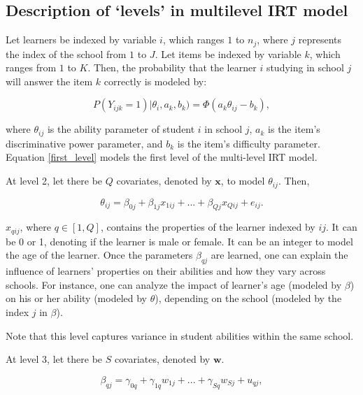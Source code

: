\documentclass[12pt]{article}
\begin{document}
\subsection{Description of `levels' in multilevel IRT model}

Let learners be indexed by variable $i$, which ranges $1$ to $n_j$, where $j$ represents the index of the school from $1$ to $J$. Let items be indexed by variable $k$, which ranges from $1$ to $K$. Then, the probability that the learner $i$ studying in school $j$ will answer the item $k$ correctly is modeled by:

\begin{equation}\label{first_level}
    P(Y_{ijk}=1) | \theta_i, a_k, b_k) = \Phi(a_k \theta_{ij} - b_k),
\end{equation}

where $\theta_{ij}$ is the ability parameter of student $i$ in school $j$, $a_k$ is the item's discriminative power parameter, and $b_k$ is the item's difficulty parameter. Equation \eqref{first_level} models the first level of the multi-level IRT model.

At level 2, let there be $Q$ covariates, denoted by $\boldsymbol{x}$, to model $\theta_{ij}$. Then,

\begin{equation}\label{second_level}
    \theta_{ij} = \beta_{0j} + \beta_{1j}x_{1ij} + ... + \beta_{Qj}x_{Qij} + e_{ij}.
\end{equation}

$x_{qij}$, where $q \in [1, Q]$, contains the properties of the learner indexed by $ij$. It can be 0 or 1, denoting if the learner is male or female. It can be an integer to model the age of the learner. Once the parameters $\beta_{qj}$ are learned, one can explain the influence of learners' properties on their abilities and how they vary across schools. For instance, one can analyze the impact of learner's age (modeled by $\beta$) on his or her ability (modeled by $\theta$), depending on the school (modeled by the index $j$ in $\beta$).

Note that this level captures variance in student abilities within the same school.

At level 3, let there be $S$ covariates, denoted by $\boldsymbol{w}$.

\begin{equation}
    \beta_{qj} = \gamma_{0q} + \gamma_{1q}w_{1j} + ... + \gamma_{Sq}w_{Sj} + u_{qj},
\end{equation}
\end{document}
